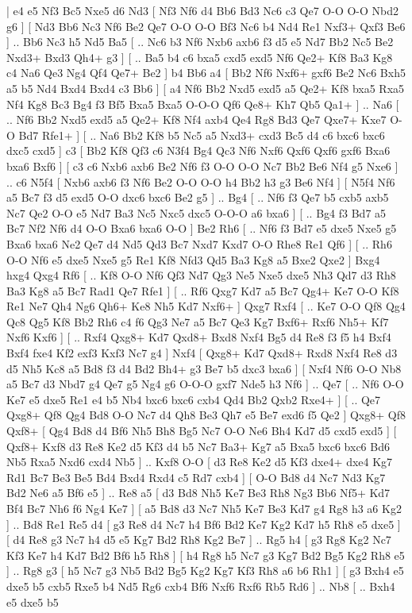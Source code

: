 \makegametitle 
|   e4   e5    Nf3   Bc5    Nxe5   d6    Nd3 [  Nf3 Nf6  d4 Bb6  Bd3 Nc6  c3 Qe7  O-O O-O  Nbd2 g6   ]  [  Nd3 Bb6  Nc3 Nf6  Be2 Qe7  O-O O-O  Bf3 Nc6  b4 Nd4  Re1 Nxf3+  Qxf3 Be6   ] .. Bb6    Nc3   h5    Nd5   Ba5 [ .. Nc6  b3 Nf6  Nxb6 axb6  f3 d5  e5 Nd7  Bb2 Nc5  Be2 Nxd3+  Bxd3 Qh4+  g3   ]  [ .. Ba5  b4 c6  bxa5 cxd5  exd5 Nf6  Qe2+ Kf8  Ba3 Kg8  c4 Na6  Qe3 Ng4  Qf4 Qe7+  Be2   ]  b4   Bb6    a4 [  Bb2 Nf6  Nxf6+ gxf6  Be2 Nc6  Bxh5 a5  b5 Nd4  Bxd4 Bxd4  c3 Bb6   ]  [  a4 Nf6  Bb2 Nxd5  exd5 a5  Qe2+ Kf8  bxa5 Rxa5  Nf4 Kg8  Bc3 Bg4  f3 Bf5  Bxa5 Bxa5  O-O-O Qf6  Qe8+ Kh7  Qb5 Qa1+   ] .. Na6 [ .. Nf6  Bb2 Nxd5  exd5 a5  Qe2+ Kf8  Nf4 axb4  Qe4 Rg8  Bd3 Qe7  Qxe7+ Kxe7  O-O Bd7  Rfe1+   ]  [ .. Na6  Bb2 Kf8  b5 Nc5  a5 Nxd3+  cxd3 Bc5  d4 c6  bxc6 bxc6  dxc5 cxd5   ]  c3 [  Bb2 Kf8  Qf3 c6  N3f4 Bg4  Qc3 Nf6  Nxf6 Qxf6  Qxf6 gxf6  Bxa6 bxa6  Bxf6   ]  [  c3 c6  Nxb6 axb6  Be2 Nf6  f3 O-O  O-O Nc7  Bb2 Be6  Nf4 g5  Nxe6   ] .. c6    N5f4 [  Nxb6 axb6  f3 Nf6  Be2 O-O  O-O h4  Bb2 h3  g3 Be6  Nf4   ]  [  N5f4 Nf6  a5 Bc7  f3 d5  exd5 O-O  dxc6 bxc6  Be2 g5   ] .. Bg4 [ .. Nf6  f3 Qe7  b5 cxb5  axb5 Nc7  Qe2 O-O  e5 Nd7  Ba3 Nc5  Nxc5 dxc5  O-O-O a6  bxa6   ]  [ .. Bg4  f3 Bd7  a5 Bc7  Nf2 Nf6  d4 O-O  Bxa6 bxa6  O-O   ]  Be2   Rh6 [ .. Nf6  f3 Bd7  e5 dxe5  Nxe5 g5  Bxa6 bxa6  Ne2 Qe7  d4 Nd5  Qd3 Bc7  Nxd7 Kxd7  O-O Rhe8  Re1 Qf6   ]  [ .. Rh6  O-O Nf6  e5 dxe5  Nxe5 g5  Re1 Kf8  Nfd3 Qd5  Ba3 Kg8  a5 Bxe2  Qxe2   ]  Bxg4   hxg4    Qxg4   Rf6 [ .. Kf8  O-O Nf6  Qf3 Nd7  Qg3 Ne5  Nxe5 dxe5  Nh3 Qd7  d3 Rh8  Ba3 Kg8  a5 Bc7  Rad1 Qe7  Rfe1   ]  [ .. Rf6  Qxg7 Kd7  a5 Bc7  Qg4+ Ke7  O-O Kf8  Re1 Ne7  Qh4 Ng6  Qh6+ Ke8  Nh5 Kd7  Nxf6+   ]  Qxg7   Rxf4 [ .. Ke7  O-O Qf8  Qg4 Qc8  Qg5 Kf8  Bb2 Rh6  c4 f6  Qg3 Ne7  a5 Bc7  Qe3 Kg7  Bxf6+ Rxf6  Nh5+ Kf7  Nxf6 Kxf6   ]  [ .. Rxf4  Qxg8+ Kd7  Qxd8+ Bxd8  Nxf4 Bg5  d4 Re8  f3 f5  h4 Bxf4  Bxf4 fxe4  Kf2 exf3  Kxf3 Nc7  g4   ]  Nxf4 [  Qxg8+ Kd7  Qxd8+ Rxd8  Nxf4 Re8  d3 d5  Nh5 Kc8  a5 Bd8  f3 d4  Bd2 Bh4+  g3 Be7  b5 dxc3  bxa6   ]  [  Nxf4 Nf6  O-O Nb8  a5 Bc7  d3 Nbd7  g4 Qe7  g5 Ng4  g6 O-O-O  gxf7 Nde5  h3 Nf6   ] .. Qe7 [ .. Nf6  O-O Ke7  e5 dxe5  Re1 e4  b5 Nb4  bxc6 bxc6  cxb4 Qd4  Bb2 Qxb2  Rxe4+   ]  [ .. Qe7  Qxg8+ Qf8  Qg4 Bd8  O-O Nc7  d4 Qh8  Be3 Qh7  e5 Be7  exd6 f5  Qe2   ]  Qxg8+   Qf8    Qxf8+ [  Qg4 Bd8  d4 Bf6  Nh5 Bh8  Bg5 Nc7  O-O Ne6  Bh4 Kd7  d5 cxd5  exd5   ]  [  Qxf8+ Kxf8  d3 Re8  Ke2 d5  Kf3 d4  b5 Nc7  Ba3+ Kg7  a5 Bxa5  bxc6 bxc6  Bd6 Nb5  Rxa5 Nxd6  cxd4 Nb5   ] .. Kxf8    O-O [  d3 Re8  Ke2 d5  Kf3 dxe4+  dxe4 Kg7  Rd1 Bc7  Be3 Be5  Bd4 Bxd4  Rxd4 c5  Rd7 cxb4   ]  [  O-O Bd8  d4 Nc7  Nd3 Kg7  Bd2 Ne6  a5 Bf6  e5   ] .. Re8    a5 [  d3 Bd8  Nh5 Ke7  Be3 Rh8  Ng3 Bb6  Nf5+ Kd7  Bf4 Bc7  Nh6 f6  Ng4 Ke7   ]  [  a5 Bd8  d3 Nc7  Nh5 Ke7  Be3 Kd7  g4 Rg8  h3 a6  Kg2   ] .. Bd8    Re1   Re5    d4 [  g3 Re8  d4 Nc7  h4 Bf6  Bd2 Ke7  Kg2 Kd7  h5 Rh8  e5 dxe5   ]  [  d4 Re8  g3 Nc7  h4 d5  e5 Kg7  Bd2 Rh8  Kg2 Be7   ] .. Rg5    h4 [  g3 Rg8  Kg2 Nc7  Kf3 Ke7  h4 Kd7  Bd2 Bf6  h5 Rh8   ]  [  h4 Rg8  h5 Nc7  g3 Kg7  Bd2 Bg5  Kg2 Rh8  e5   ] .. Rg8    g3 [  h5 Nc7  g3 Nb5  Bd2 Bg5  Kg2 Kg7  Kf3 Rh8  a6 b6  Rh1   ]  [  g3 Bxh4  e5 dxe5  b5 cxb5  Rxe5 b4  Nd5 Rg6  cxb4 Bf6  Nxf6 Rxf6  Rb5 Rd6   ] .. Nb8 [ .. Bxh4  e5 dxe5  b5 